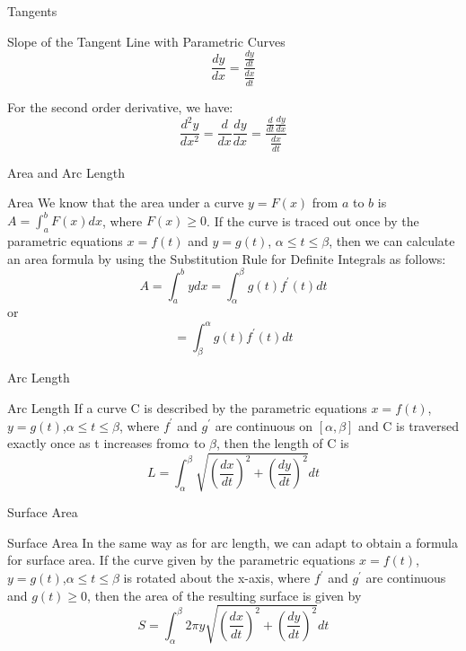 \begin{frame}{Tangents}
    \begin{block}{Slope of the Tangent Line with Parametric Curves}
        $$\frac{dy}{dx}=\frac{\frac{dy}{dt}}{\frac{dx}{dt}}$$
    \end{block}
    For the second order derivative, we have:\\
    $$\frac{d^2y}{dx^2}=\frac{d}{dx}\frac{dy}{dx}=\frac{\frac{d}{dt}\frac{dy}{dx}}{\frac{dx}{dt}}$$
\end{frame}

\begin{frame}{Area and Arc Length}
    \begin{block}{Area}
        We know that the area under a curve $y = F(x)$ from $a$ to $b$ is
        $A = \int_a ^b F(x) dx$, where $F(x) \geqslant 0$. If the curve is traced out once by the parametric equations $x = f(t)$ and $y = g(t)$, $\alpha \leqslant t \leqslant \beta$, then we can calculate an area formula by using the Substitution Rule for Definite Integrals as follows:
        $$A=\int _a^b y dx = \int_{\alpha}^{\beta} g(t) f^{\prime}(t) dt$$ or $$=\int^{\alpha}_{\beta} g(t) f^{\prime}(t) dt$$
    \end{block}
\end{frame}

\begin{frame}{Arc Length}
    \begin{block}{Arc Length}
        If a curve C is described by the parametric equations $x = f(t)$,$y = g(t)$,$\alpha \leqslant t \leqslant \beta $, where $f^{\prime}$ and $g^{\prime}$ are continuous on $[\alpha,\beta]$ and C is traversed exactly once as t increases from$\alpha$ to $\beta$, then the length of C is
        $$L=\int_{\alpha}^{\beta}\sqrt{(\frac{dx}{dt})^2+(\frac{dy}{dt})^2} dt $$
    \end{block}
\end{frame}

\begin{frame}{Surface Area}
    \begin{block}{Surface Area}
        In the same way as for arc length, we can adapt to obtain a formula for
        surface area. If the curve given by the parametric equations $x = f(t)$,$y = g(t)$,$\alpha \leqslant t \leqslant \beta $ is rotated about the x-axis, where $f^{\prime}$ and $g^{\prime}$ are continuous and $g(t) \geqslant 0$, then the area of the resulting surface is given by
        $$ S=\int_{\alpha}^{\beta} 2\pi y\sqrt{(\frac{dx}{dt})^2+(\frac{dy}{dt})^2} dt $$
    \end{block}

\end{frame}

